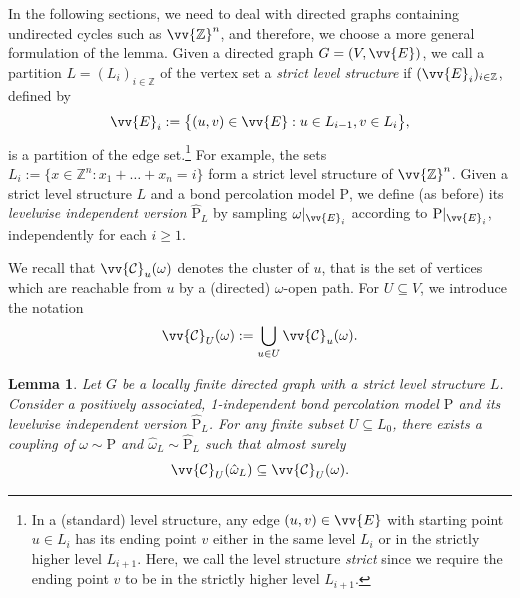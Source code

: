 \documentclass[11pt]{article}
\renewcommand{\P}{\mathrm{P}}
\newcommand{\Z}{\mathbb{Z}}
\newtheorem{lemma}{Lemma}
\theoremstyle{remark}
\begin{document}
In the following sections, we need to deal with directed graphs containing undirected cycles such as $\vv{\Z}^n$, and therefore, we choose a more general formulation of the lemma. Given a directed graph $G=(V,\vv{E})$, we call a partition $L = (L_i)_{i\in \Z}$ of the vertex set a \emph{strict level structure}  if $(\vv{E}_{i})_{i\in \Z}$, defined by 
\begin{equation}
	\vv{E}_{i} := \big\{(u,v) \in \vv{E} : u \in L_{i-1}, v \in L_i\big\},
\end{equation}
is a partition of the edge set.\footnote{In a (standard) level structure, any edge $(u,v)\in \vv{E}$ with starting point $u \in L_i$ has its ending point $v$ either in the same level $L_i$ or in the strictly higher level $L_{i+1}$. Here, we call the level structure \emph{strict} since we require the ending point $v$ to be in the strictly higher level $L_{i+1}$.} For example, the sets $L_i := \{x \in \Z^n : x_1 + \ldots + x_n =  i\}$ form a strict level structure of $\vv{\Z}^n$. 
Given a strict level structure $L$ and a bond percolation model $\P$, we define (as before) its \emph{levelwise independent version} $\hat{\P}_L$  by sampling $\omega\vert_{\vv{E}_i}$ according to $\P\vert_{\vv{E}_i}$, independently for each $i\ge 1$.  

We recall that $\vv{\mathcal{C}}_u(\omega)$ denotes the cluster of $u$, that is the set of vertices which are reachable from $u$ by a (directed) $\omega$-open path. For $U \subseteq V$, we introduce the notation 
\begin{equation}
	\vv{\mathcal{C}}_U(\omega) := \bigcup_{u \in U}	\vv{\mathcal{C}}_u(\omega).
\end{equation}

\begin{lemma}\label{lem:levelwise-decoupling}
	Let $G$ be a locally finite directed graph with a strict level structure $L$. Consider a positively associated, 1-independent bond percolation model $\P$ and its levelwise independent version $\hat{\P}_L$. For any finite subset $U \subseteq L_0$, there exists a coupling of $\omega \sim \P$ and $\hat{\omega}_L \sim \hat{\P}_L$ such that almost surely
	\begin{equation}
		\vv{\mathcal{C}}_U(\hat{\omega}_L) \subseteq \vv{\mathcal{C}}_U(\omega) .
	\end{equation}
\end{lemma}
\end{document}
